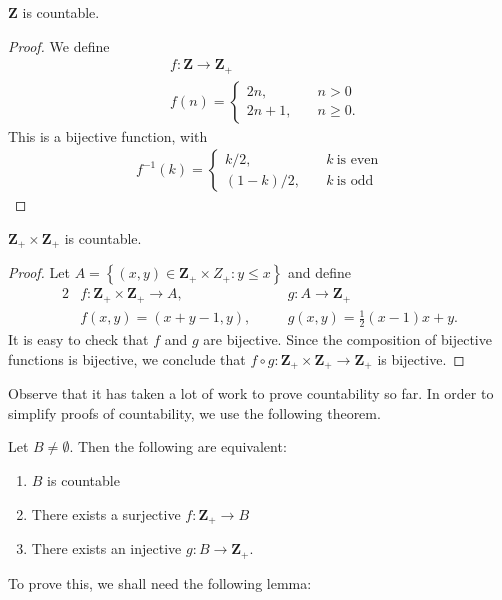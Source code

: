 \begin{claim}
$\mathbf{Z}$ is countable.
\end{claim}
\begin{proof} We define
\begin{equation*}
\begin{split}
& f: \mathbf{Z} \to \mathbf{Z}_{+}
\\
& f(n) = \begin{cases}
2n, \quad & n > 0 \\
2n+1, \quad & n \ge 0.
\end{cases}
\end{split}
\end{equation*}
This is a bijective function, with
\begin{equation*}
\begin{split}
f^{-1}(k) =
\begin{cases}
k/2, \quad & k \ \text{is even} \\
(1-k)/2, \quad & k \ \text{is odd}
\end{cases}
\end{split}
\end{equation*}
\end{proof}
\begin{claim}
$\mathbf{Z}_{+} \times \mathbf{Z}_{+}$ is countable.
\end{claim}
\begin{proof}Let $A = \left\{(x,y) \in \mathbf{Z}_{+} \times
Z_{+}: y \le x\right\}$
and define
\begin{alignat*}{2}
& f: \mathbf{Z}_{+} \times \mathbf{Z}_{+} \to A, \quad && g: A \to
\mathbf{Z}_{+} \\
& f(x,y) = (x + y-1, y),  \quad && g(x,y) = \frac{1}{2}(x-1)x + y.
\end{alignat*}
It is easy to check that $f$ and $g$ are bijective. Since the composition of
bijective functions is bijective, we conclude that $f \circ g: \mathbf{Z}_{+}
\times
\mathbf{Z}_{+} \to \mathbf{Z}_{+}$ is bijective.
\end{proof}

Observe that it has taken a lot of work to prove countability so far.
In order to simplify proofs of countability, we use the following theorem.
\begin{theorem}\label{thm:proof-countability}
Let $B \neq \emptyset$. Then the following are equivalent:
\begin{enumerate}
  \item\label{it:1} $B$ is countable
  \item\label{it:2} There exists a surjective $f: \mathbf{Z}_{+} \to B$
  \item\label{it:3} There exists an injective $g: B \to \mathbf{Z}_{+}$.
\end{enumerate}
\end{theorem}
To prove this, we shall need the following lemma:

